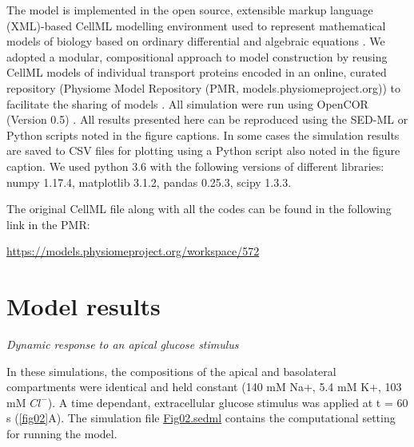 \documentclass[fleqn,10pt]{physiome}
\begin{document}
The model is implemented in the open source, extensible markup language
(XML)-based CellML modelling environment used to represent mathematical
models of biology based on ordinary differential and algebraic equations \citep{cuellar2003overview}. We adopted a modular, compositional approach to model
construction by reusing CellML models of individual transport proteins encoded
in an online, curated repository (Physiome Model Repository (PMR,
models.physiomeproject.org)) to facilitate the sharing of models \citep{yu2011physiome}. All simulation were run using OpenCOR (Version 0.5) \citep{garny2015opencor}.
All results presented here can be reproduced using the SED-ML or Python scripts noted in the figure captions. In some cases the simulation results are saved to CSV files for plotting using a Python script also noted in the figure caption. We used python 3.6 with the following versions of different libraries: numpy 1.17.4, matplotlib 3.1.2, pandas 0.25.3, scipy 1.3.3.

The original CellML file along with all the codes can be found in the following link in the PMR:\newline

\url{https://models.physiomeproject.org/workspace/572}\newline\newline

\section{Model results}
\textit{Dynamic response to an apical glucose stimulus}\newline

In these simulations, the compositions of the apical and basolateral compartments were identical
and held constant (140 mM Na+, 5.4 mM K+, 103 mM ${Cl^-}$). A time dependant, extracellular glucose stimulus was applied at t = 60 s (\autoref{fig02}A). The simulation file \href{https://models.physiomeproject.org/workspace/572/file/057757b3a8de9a56b4bd32b8a12a0f00af1d8213/SEDML_files/Fig02.sedml}{Fig02.sedml} contains the computational setting for running the model.\newline
\end{document}
